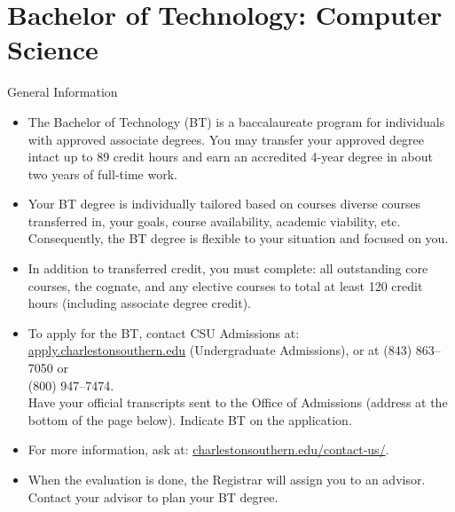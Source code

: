 \label{program:bt-cs}%
\section*{Bachelor of Technology: Computer Science}
\begin{reqgroup}{General Information}
\begin{itemize}\small

	\item The Bachelor of Technology (BT) is a baccalaureate program for individuals with approved associate degrees. You may transfer your approved degree intact up to 89 credit hours and earn an accredited 4-year degree in about two years of full-time work.

	\item Your BT degree is individually tailored based on courses diverse courses transferred in, your goals, course availability, academic viability, etc. Consequently, the BT degree is flexible to your situation and focused on you.

	\item In addition to transferred credit, you must complete: all outstanding core courses, the cognate, and any elective courses to total at least 120 credit hours (including associate degree credit).

	\item To apply for the BT, contact CSU Admissions at:
		\href{https://apply.charlestonsouthern.edu/}{apply.charlestonsouthern.edu} (Undergraduate Admissions), or at (843) 863--7050 or \\(800) 947--7474.\\
		Have your official transcripts sent to the Office of Admissions (address at the bottom of the page below). Indicate BT on the application.

	\item For more information, ask at: \href{https://www.charlestonsouthern.edu/contact-us/}{charlestonsouthern.edu/contact-us/}.


	\item When the evaluation is done, the Registrar will assign you to an advisor. Contact your advisor to plan your BT degree.
\end{itemize}
\end{reqgroup}

